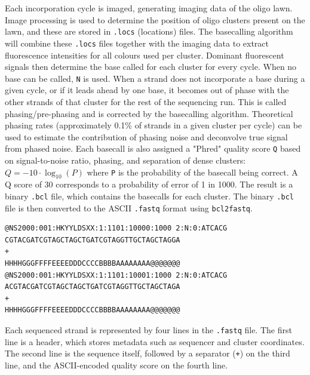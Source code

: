 Each incorporation cycle is imaged, generating imaging data of the oligo lawn. Image processing is used to determine the position of oligo clusters present on the lawn, and these are stored in \verb|.locs| (locations) files. The basecalling algorithm will combine these \verb|.locs| files together with the imaging data to extract fluorescence intensities for all colours used per cluster. Dominant fluorescent signals then determine the base called for each cluster for every cycle.  When no base can be called, \verb|N| is used. When a strand does not incorporate a base during a given cycle, or if it leads ahead by one base, it becomes out of phase with the other strands of that cluster for the rest of the sequencing run. This is called phasing/pre-phasing and is corrected by the basecalling algorithm. Theoretical phasing rates (approximately 0.1\% of strands in a given cluster per cycle) can be used to estimate the contribution of phasing noise and deconvolve true signal from phased noise. Each basecall is also assigned a "Phred" quality score \verb|Q| based on signal-to-noise ratio, phasing, and separation of dense clusters: \( Q = -10 \cdot \log_{10} (P) \) where \verb|P| is the probability of the basecall being correct. A Q score of 30 corresponds to a probability of error of 1 in 1000.  The result is a binary \verb|.bcl| file, which contains the basecalls for each cluster. The binary \verb|.bcl| file is then converted to the ASCII \verb|.fastq| format using \verb|bcl2fastq|.

\begin{center}
	\begin{lstlisting}
@NS2000:001:HKYYLDSXX:1:1101:10000:1000 2:N:0:ATCACG
CGTACGATCGTAGCTAGCTGATCGTAGGTTGCTAGCTAGGA
+
HHHHGGGFFFFEEEEDDDCCCCBBBBAAAAAAAA@@@@@@@
@NS2000:001:HKYYLDSXX:1:1101:10001:1000 2:N:0:ATCACG 
ACGTACGATCGTAGCTAGCTGATCGTAGGTTGCTAGCTAGA
+
HHHHGGGFFFFEEEEDDDCCCCBBBBAAAAAAAA@@@@@@@
\end{lstlisting}
\end{center}

Each sequenced strand is represented by four lines in the \verb|.fastq| file. The first line is a header, which stores metadata such as sequencer and cluster coordinates. The second line is the sequence itself, followed by a separator (\verb|+|) on the third line, and the ASCII-encoded quality score on the fourth line.

